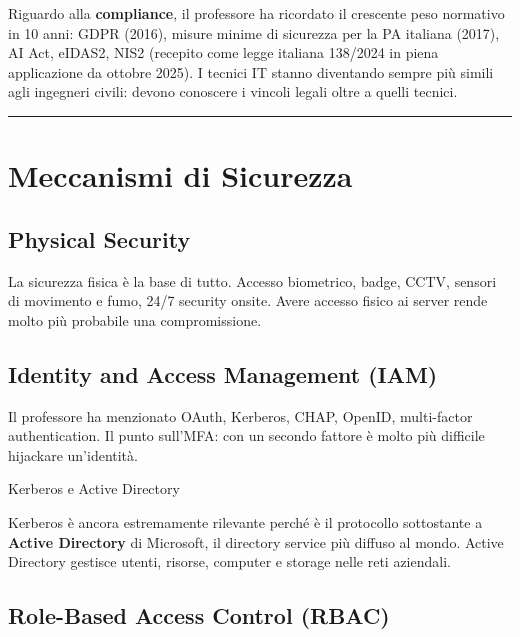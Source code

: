 \documentclass[
  italian,
  openany]{book}
\begin{document}
Riguardo alla \textbf{compliance}, il professore ha ricordato il
crescente peso normativo in 10 anni: GDPR (2016), misure minime di
sicurezza per la PA italiana (2017), AI Act, eIDAS2, NIS2 (recepito come
legge italiana 138/2024 in piena applicazione da ottobre 2025). I
tecnici IT stanno diventando sempre più simili agli ingegneri civili:
devono conoscere i vincoli legali oltre a quelli tecnici.

\begin{center}\rule{0.5\linewidth}{0.5pt}\end{center}

\section{Meccanismi di Sicurezza}\label{meccanismi-di-sicurezza}

\subsection{Physical Security}\label{physical-security}

La sicurezza fisica è la base di tutto. Accesso biometrico, badge, CCTV,
sensori di movimento e fumo, 24/7 security onsite. Avere accesso fisico
ai server rende molto più probabile una compromissione.

\subsection{Identity and Access Management
(IAM)}\label{identity-and-access-management-iam}

Il professore ha menzionato OAuth, Kerberos, CHAP, OpenID, multi-factor
authentication. Il punto sull'MFA: con un secondo fattore è molto più
difficile hijackare un'identità.

\begin{calloutnote}{Kerberos e Active Directory}

Kerberos è ancora estremamente rilevante perché è il protocollo
sottostante a \textbf{Active Directory} di Microsoft, il directory
service più diffuso al mondo. Active Directory gestisce utenti, risorse,
computer e storage nelle reti aziendali.

\end{calloutnote}

\subsection{Role-Based Access Control
(RBAC)}\label{role-based-access-control-rbac}
\end{document}

